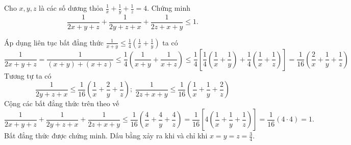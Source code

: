 \begin{problem}
	Cho $x, y, z$ là các số dương thỏa $\displaystyle \frac{1}{x} + \frac{1}{y} + \frac{1}{z} = 4$. Chứng minh 
	\[
		\frac{1}{2x + y + z} + \frac{1}{2y + z + x} + \frac{1}{2z + x + y} \le 1.
	\]
	\solution

	Áp dụng liên tục bất đẳng thức $\displaystyle \frac{1}{x + y} \le \frac{1}{4}\left(\frac{1}{x} + \frac{1}{y}\right)$ ta có
	\[
		\frac{1}{2x + y + z} = \frac{1}{(x + y) + (x + z)} 
		\le \frac{1}{4}\left(\frac{1}{x + y} + \frac{1}{x + z}\right)
		\le \frac{1}{4}\left[\frac{1}{4}\left(\frac{1}{x} + \frac{1}{y}\right) +
		\frac{1}{4}\left(\frac{1}{x} + \frac{1}{z}\right)\right] 
		= \frac{1}{16}\left(\frac{2}{x} + \frac{1}{y} + \frac{1}{z}\right)
	\]
	Tương tự ta có
	\[
		\frac{1}{2y + z + x} \le \frac{1}{16}\left(\frac{1}{x} + \frac{2}{y} + \frac{1}{z}\right); \; \frac{1}{2z + x + y} \le \frac{1}{16}\left(\frac{1}{x} + \frac{1}{y} + \frac{2}{z}\right)
	\]
	Cộng các bất đẳng thức trên theo vế
	\[
		\frac{1}{2x + y + z} + \frac{1}{2y + z + x} + \frac{1}{2z + x + y} 
		\le \frac{1}{16}\left(\frac{4}{x} + \frac{4}{y} + \frac{4}{z}\right)
		= \frac{1}{16}\left[4\left(\frac{1}{x} + \frac{1}{y} + \frac{1}{z}\right)\right]
		= \frac{1}{16}(4 \cdot 4) = 1.
	\]
	Bất đẳng thức được chứng minh. Dấu bằng xảy ra khi và chỉ khi $\displaystyle x = y = z = \frac{3}{4}$.
\end{problem}